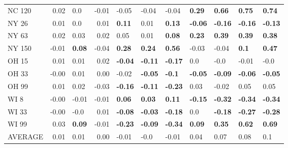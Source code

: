 \begin{tabular}{lrlrlllllll}
NC 120  &     0.02 &            0.0 &    -0.01 &           -0.05 &           -0.04 &           -0.04 &   \textbf{0.29} &   \textbf{0.66} &   \textbf{0.75} &   \textbf{0.74} \\
NY 26   &     0.01 &            0.0 &     0.01 &   \textbf{0.11} &            0.01 &   \textbf{0.13} &  \textbf{-0.06} &  \textbf{-0.16} &  \textbf{-0.16} &  \textbf{-0.13} \\
NY 63   &     0.02 &           0.03 &     0.02 &            0.05 &            0.01 &   \textbf{0.08} &   \textbf{0.23} &   \textbf{0.39} &   \textbf{0.39} &   \textbf{0.38} \\
NY 150  &    -0.01 &  \textbf{0.08} &    -0.04 &   \textbf{0.28} &   \textbf{0.24} &   \textbf{0.56} &           -0.03 &           -0.04 &    \textbf{0.1} &   \textbf{0.47} \\
OH 15   &     0.01 &           0.01 &     0.02 &  \textbf{-0.04} &  \textbf{-0.11} &  \textbf{-0.17} &             0.0 &            -0.0 &           -0.01 &            -0.0 \\
OH 33   &    -0.00 &           0.01 &     0.00 &           -0.02 &  \textbf{-0.05} &   \textbf{-0.1} &  \textbf{-0.05} &  \textbf{-0.09} &  \textbf{-0.06} &  \textbf{-0.05} \\
OH 99   &     0.01 &           0.02 &    -0.03 &  \textbf{-0.16} &  \textbf{-0.11} &  \textbf{-0.23} &            0.03 &           -0.02 &            0.05 &            0.05 \\
WI 8    &    -0.00 &          -0.01 &    -0.01 &   \textbf{0.06} &   \textbf{0.03} &   \textbf{0.11} &  \textbf{-0.15} &  \textbf{-0.32} &  \textbf{-0.34} &  \textbf{-0.34} \\
WI 33   &    -0.00 &           -0.0 &     0.01 &  \textbf{-0.08} &  \textbf{-0.03} &  \textbf{-0.18} &             0.0 &  \textbf{-0.18} &  \textbf{-0.27} &  \textbf{-0.28} \\
WI 99   &     0.03 &  \textbf{0.09} &    -0.01 &  \textbf{-0.23} &  \textbf{-0.09} &  \textbf{-0.34} &   \textbf{0.09} &   \textbf{0.35} &   \textbf{0.62} &   \textbf{0.69} \\
AVERAGE &     0.01 &           0.01 &     0.00 &           -0.01 &            -0.0 &           -0.01 &            0.04 &            0.07 &            0.08 &             0.1 \\
\bottomrule
\end{tabular}
